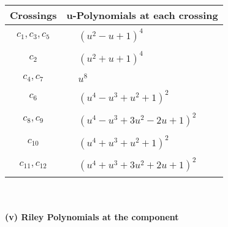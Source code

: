 \documentclass[1p]{elsarticle_modified}
\theoremstyle{definition}
\begin{document}
\begin{tabular}{m{50pt}|m{274pt}}
Crossings & \hspace{64pt}u-Polynomials at each crossing \\
\hline $$\begin{aligned}c_{1},c_{3},c_{5}\end{aligned}$$&$\begin{aligned}
&(u^2- u+1)^4
\end{aligned}$\\
\hline $$\begin{aligned}c_{2}\end{aligned}$$&$\begin{aligned}
&(u^2+u+1)^4
\end{aligned}$\\
\hline $$\begin{aligned}c_{4},c_{7}\end{aligned}$$&$\begin{aligned}
&u^8
\end{aligned}$\\
\hline $$\begin{aligned}c_{6}\end{aligned}$$&$\begin{aligned}
&(u^4- u^3+u^2+1)^2
\end{aligned}$\\
\hline $$\begin{aligned}c_{8},c_{9}\end{aligned}$$&$\begin{aligned}
&(u^4- u^3+3 u^2-2 u+1)^2
\end{aligned}$\\
\hline $$\begin{aligned}c_{10}\end{aligned}$$&$\begin{aligned}
&(u^4+u^3+u^2+1)^2
\end{aligned}$\\
\hline $$\begin{aligned}c_{11},c_{12}\end{aligned}$$&$\begin{aligned}
&(u^4+u^3+3 u^2+2 u+1)^2
\end{aligned}$\\
\hline
\end{tabular}\\~\\
\newpage\renewcommand{\arraystretch}{1}
\flushleft \textbf{(v) Riley Polynomials at the component}\newline \\
\end{document}
